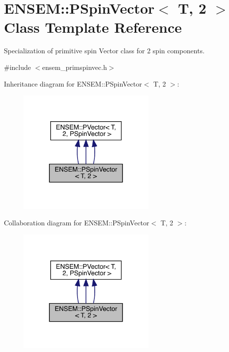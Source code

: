 \hypertarget{classENSEM_1_1PSpinVector_3_01T_00_012_01_4}{}\section{E\+N\+S\+EM\+:\+:P\+Spin\+Vector$<$ T, 2 $>$ Class Template Reference}
\label{classENSEM_1_1PSpinVector_3_01T_00_012_01_4}


Specialization of primitive spin Vector class for 2 spin components.  




{\ttfamily \#include $<$ensem\+\_\+primspinvec.\+h$>$}



Inheritance diagram for E\+N\+S\+EM\+:\+:P\+Spin\+Vector$<$ T, 2 $>$\+:
\nopagebreak
\begin{figure}[H]
\begin{center}
\leavevmode
\includegraphics[width=192pt]{db/d58/classENSEM_1_1PSpinVector_3_01T_00_012_01_4__inherit__graph}
\end{center}
\end{figure}


Collaboration diagram for E\+N\+S\+EM\+:\+:P\+Spin\+Vector$<$ T, 2 $>$\+:
\nopagebreak
\begin{figure}[H]
\begin{center}
\leavevmode
\includegraphics[width=192pt]{dc/da2/classENSEM_1_1PSpinVector_3_01T_00_012_01_4__coll__graph}
\end{center}
\end{figure}
